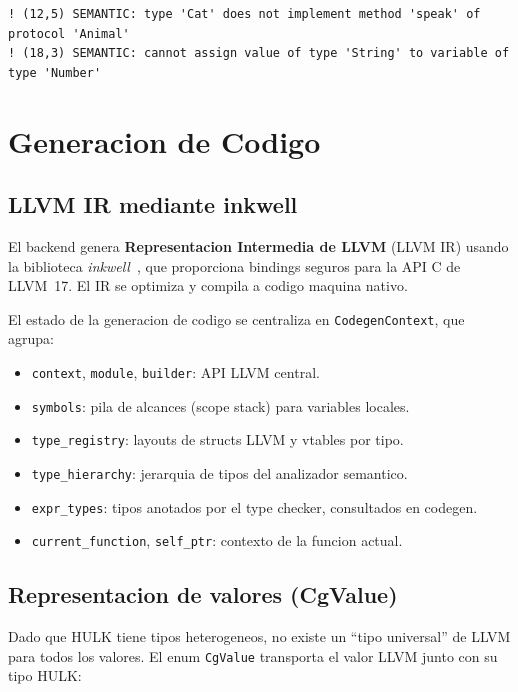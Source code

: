 \documentclass[12pt,a4paper]{article}
\begin{document}
\begin{verbatim}
! (12,5) SEMANTIC: type 'Cat' does not implement method 'speak' of protocol 'Animal'
! (18,3) SEMANTIC: cannot assign value of type 'String' to variable of type 'Number'
\end{verbatim}

\section{Generacion de Codigo}

\subsection{LLVM IR mediante inkwell}

El backend genera \textbf{Representacion Intermedia de LLVM} (LLVM IR) usando la
biblioteca \textit{inkwell}~\cite{inkwell}, que proporciona bindings seguros para la
API C de LLVM~17. El IR se optimiza y compila a codigo maquina nativo.

El estado de la generacion de codigo se centraliza en \texttt{CodegenContext}, que
agrupa:
\begin{itemize}
  \item \texttt{context}, \texttt{module}, \texttt{builder}: API LLVM central.
  \item \texttt{symbols}: pila de alcances (scope stack) para variables locales.
  \item \texttt{type\_registry}: layouts de structs LLVM y vtables por tipo.
  \item \texttt{type\_hierarchy}: jerarquia de tipos del analizador semantico.
  \item \texttt{expr\_types}: tipos anotados por el type checker, consultados en codegen.
  \item \texttt{current\_function}, \texttt{self\_ptr}: contexto de la funcion actual.
\end{itemize}

\subsection{Representacion de valores (CgValue)}

Dado que HULK tiene tipos heterogeneos, no existe un ``tipo universal'' de LLVM
para todos los valores. El enum \texttt{CgValue} transporta el valor LLVM junto con
su tipo HULK:
\end{document}
